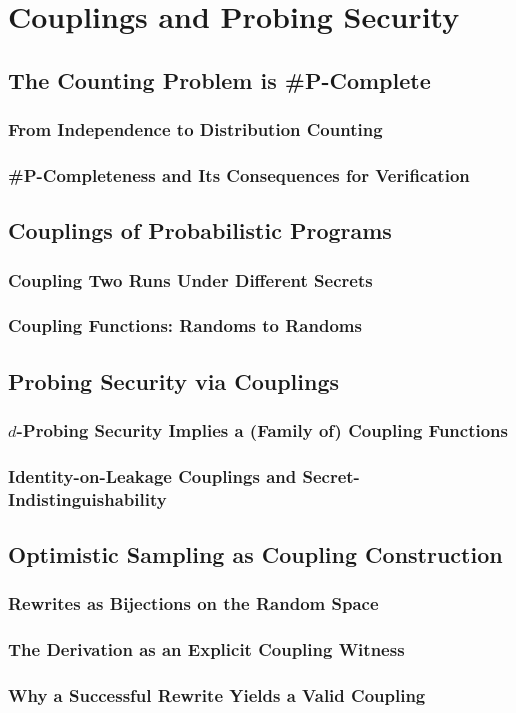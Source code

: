 \chapter{Couplings and Probing Security}
\section{The Counting Problem is \#P-Complete} %
  \subsection{From Independence to Distribution Counting}
  \subsection{\#P-Completeness and Its Consequences for Verification}
\section{Couplings of Probabilistic Programs}
  \subsection{Coupling Two Runs Under Different Secrets}
  \subsection{Coupling Functions: Randoms to Randoms} %
\section{Probing Security via Couplings}
  \subsection{$d$-Probing Security Implies a (Family of) Coupling Functions} 
  \subsection{Identity-on-Leakage Couplings and Secret-Indistinguishability}
\section{Optimistic Sampling as Coupling Construction}
  \subsection{Rewrites as Bijections on the Random Space}
  \subsection{The Derivation as an Explicit Coupling Witness}
  \subsection{Why a Successful Rewrite Yields a Valid Coupling}
